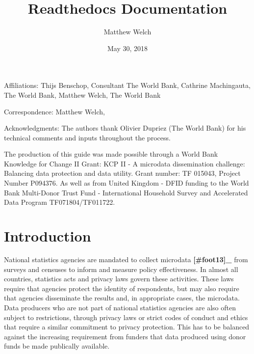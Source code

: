 \documentclass[letterpaper,10pt,english]{sphinxmanual}
\title{Readthedocs Documentation}
\date{May 30, 2018}
\author{Matthew Welch}
\begin{document}
\maketitle
\sphinxtableofcontents
{}\label{\detokenize{index::doc}}





Affiliations: Thijs Benschop, Consultant The World Bank, Cathrine
Machingauta, The World Bank, Matthew Welch, The World Bank

Correspondence: Matthew Welch, 

Acknowledgments: The authors thank Olivier Dupriez (The World Bank) for
his technical comments and inputs throughout the process.

The production of this guide was made possible through a World Bank
Knowledge for Change II Grant: KCP II - A microdata dissemination
challenge: Balancing data protection and data utility. Grant number: TF
015043, Project Number P094376. As well as from United Kingdom - DFID
funding to the World Bank Multi-Donor Trust Fund - International
Household Survey and Accelerated Data Program \textendash{} TF071804/TF011722.


\chapter{Introduction}
\label{\detokenize{intro::doc}}\label{\detokenize{intro:introduction}}\label{\detokenize{intro:statistical-disclosure-control-for-microdata-a-practice-guide}}
National statistics agencies are mandated to collect
microdata {\color{red}\bfseries{}{[}\#foot13{]}\_} from surveys and censuses to inform and
measure policy effectiveness. In almost all countries, statistics acts
and privacy laws govern these activities. These laws require that
agencies protect the identity of respondents, but may also require that
agencies disseminate the results and, in appropriate cases, the
microdata. Data producers who are not part of national statistics
agencies are also often subject to restrictions, through privacy laws or
strict codes of conduct and ethics that require a similar commitment to
privacy protection. This has to be balanced against the increasing
requirement from funders that data produced using donor funds be made
publically available.
\end{document}
